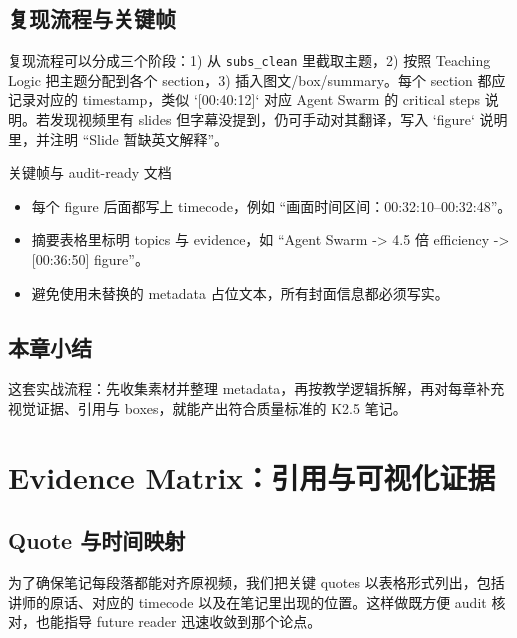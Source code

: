 \documentclass[a4paper]{article}
\begin{document}
\subsection{复现流程与关键帧}
复现流程可以分成三个阶段：1) 从 \texttt{subs\_clean} 里截取主题，2) 按照 Teaching Logic 把主题分配到各个 section，3) 插入图文/box/summary。每个 section 都应记录对应的 timestamp，类似 `[00:40:12]` 对应 Agent Swarm 的 critical steps 说明。若发现视频里有 slides 但字幕没提到，仍可手动对其翻译，写入 `figure` 说明里，并注明 ``Slide 暂缺英文解释''。

\begin{knowledgebox}{关键帧与 audit-ready 文档}
\begin{itemize}
    \item 每个 figure 后面都写上 timecode，例如 ``画面时间区间：00:32:10--00:32:48''。
    \item 摘要表格里标明 topics 与 evidence，如 ``Agent Swarm -> 4.5 倍 efficiency -> [00:36:50] figure''。
    \item 避免使用未替换的 metadata 占位文本，所有封面信息都必须写实。
\end{itemize}
\end{knowledgebox}

\subsection{本章小结}
这套实战流程：先收集素材并整理 metadata，再按教学逻辑拆解，再对每章补充视觉证据、引用与 boxes，就能产出符合质量标准的 K2.5 笔记。

\section{Evidence Matrix：引用与可视化证据}

\subsection{Quote 与时间映射}
\label{sec:evidence-quotes}
为了确保笔记每段落都能对齐原视频，我们把关键 quotes 以表格形式列出，包括讲师的原话、对应的 timecode 以及在笔记里出现的位置。这样做既方便 audit 核对，也能指导 future reader 迅速收敛到那个论点。
\end{document}
